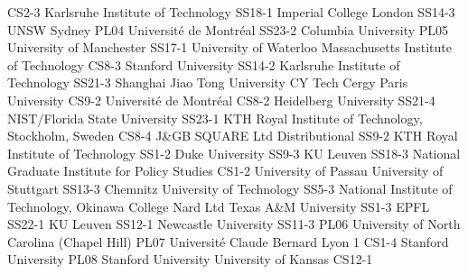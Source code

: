 \begin{multicols}{2}
{CS2-3}
{}
{ Karlsruhe Institute of Technology }
{SS18-1}
{}
{ Imperial College London }
{SS14-3}
{}
{ UNSW Sydney }
{PL04}
{}
{ Université de Montréal }
{SS23-2}
{}
{ Columbia University }
{PL05}
{}
{ University of Manchester }
{SS17-1}
{}
{ University of Waterloo }
{}
{}
{ Massachusetts Institute of Technology }
{CS8-3}
{}
{ Stanford University }
{SS14-2}
{}
{ Karlsruhe Institute of Technology }
{SS21-3}
{}
{ Shanghai Jiao Tong University }
{}
{}
{ CY Tech Cergy Paris University }
{CS9-2}
{}
{ Université de Montréal }
{CS8-2}
{}
{ Heidelberg University }
{SS21-4}
{}
{ NIST/Florida State University }
{SS23-1}
{}
{ KTH Royal Institute of Technology, Stockholm, Sweden }
{CS8-4}
{}
{ J\&GB SQUARE Ltd }
{}
{}
{ Distributional }
{SS9-2}
{}
{ KTH Royal Institute of Technology }
{SS1-2}
{}
{ Duke University }
{SS9-3}
{}
{ KU Leuven }
{SS18-3}
{}
{ National Graduate Institute for Policy Studies }
{CS1-2}
{}
{}
{}
{}
{ University of Passau }
{}
{}
{ University of Stuttgart }
{SS13-3}
{}
{ Chemnitz University of Technology }
{SS5-3}
{}
{ National Institute of Technology, Okinawa College }
{}
{}
{ Nard Ltd }
{}
{}
{ Texas A\&M University }
{SS1-3}
{}
{ EPFL }
{SS22-1}
{}
{ KU Leuven }
{SS12-1}
{}
{ Newcastle University }
{SS11-3}
{PL06}
{ University of North Carolina (Chapel Hill) }
{PL07}
{}
{ Université Claude Bernard Lyon 1 }
{CS1-4}
{}
{ Stanford University }
{PL08}
{}
{ Stanford University }
{}
{}
{ University of Kansas }
{CS12-1}
{}

\end{multicols}
